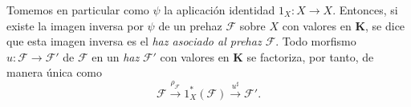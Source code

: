 \begin{env}[3.5.6]
\label{0.3.5.6-fr}
Tomemos en particular como $\psi$ la aplicación identidad
$1_X:X\to X$. Entonces, si existe la imagen inversa por $\psi$ de un prehaz
$\mathcal{F}$ sobre $X$ con valores en $\boldsymbol{K}$, se dice que esta
imagen inversa es el \emph{haz asociado al prehaz $\mathcal{F}$}.
Todo morfismo $u:\mathcal{F}\to\mathcal{F}'$ de $\mathcal{F}$ en un
\emph{haz} $\mathcal{F}'$ con valores en $\boldsymbol{K}$ se factoriza, por tanto,
de manera única como
\[
  \mathcal{F}\xrightarrow{\rho_{\mathcal{F}}}
  1_X^*(\mathcal{F})\xrightarrow{u^\sharp}\mathcal{F}'.
\]
\end{env}
